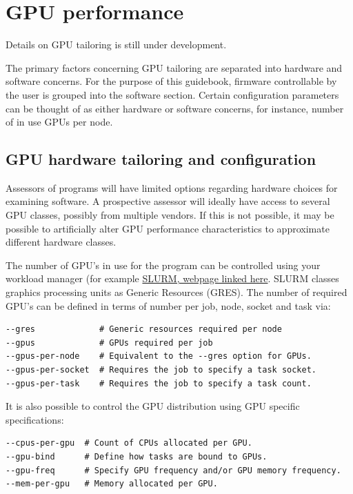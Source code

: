 \section{GPU performance}
\label{section:tailoring:gpu}

\begin{wip}
  Details on GPU tailoring is still under development.
\end{wip}

The primary factors concerning GPU tailoring are separated into hardware and software concerns. For the purpose of this guidebook, firmware controllable by the user is grouped into the software section. Certain configuration parameters can be thought of as either hardware or software concerns, for instance, number of in use GPUs per node. 

\subsection{GPU hardware tailoring and configuration}
Assessors of programs will have limited options regarding hardware choices for examining software. A prospective assessor will ideally have access to several GPU classes, possibly from multiple vendors. If this is not possible, it may be possible to artificially alter GPU performance characteristics to approximate different hardware classes.

The number of GPU's in use for the program can be controlled using your workload manager (for example \href{https://slurm.schedmd.com}{SLURM, webpage linked here}. SLURM classes graphics processing units as Generic Resources (GRES). The number of required GPU's can be defined in terms of number per job, node, socket and task via:

\begin{verbatim}
--gres             # Generic resources required per node
--gpus             # GPUs required per job
--gpus-per-node    # Equivalent to the --gres option for GPUs.
--gpus-per-socket  # Requires the job to specify a task socket.
--gpus-per-task    # Requires the job to specify a task count.
\end{verbatim}

It is also possible to control the GPU distribution using GPU specific specifications:
\begin{verbatim}
--cpus-per-gpu  # Count of CPUs allocated per GPU.
--gpu-bind      # Define how tasks are bound to GPUs.
--gpu-freq      # Specify GPU frequency and/or GPU memory frequency.
--mem-per-gpu   # Memory allocated per GPU.
\end{verbatim}

